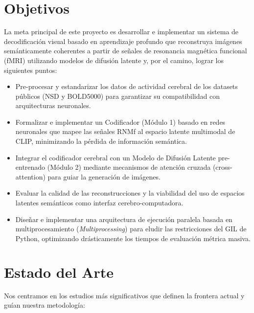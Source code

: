 \documentclass{article}
\begin{document}
\section{Objetivos}
La meta principal de este proyecto es desarrollar e implementar un sistema de decodificación visual basado en aprendizaje profundo que reconstruya imágenes semánticamente coherentes a partir de señales de resonancia magnética funcional (fMRI) utilizando modelos de difusión latente y, por el camino, lograr los siguientes puntos:
\begin{itemize}
    \item Pre-procesar y estandarizar los datos de actividad cerebral de los datasets públicos (NSD y BOLD5000) para garantizar su compatibilidad con arquitecturas neuronales.
    \item Formalizar e implementar un Codificador (Módulo 1) basado en redes neuronales que mapee las señales RNMf al espacio latente multimodal de CLIP, minimizando la pérdida de información semántica.
    \item Integrar el codificador cerebral con un Modelo de Difusión Latente pre-entrenado (Módulo 2) mediante mecanismos de atención cruzada (cross-attention) para guiar la generación de imágenes.
    \item Evaluar la calidad de las reconstrucciones y la viabilidad del uso de espacios latentes semánticos como interfaz cerebro-computadora.
    \item Diseñar e implementar una arquitectura de ejecución paralela basada en multiprocesamiento (\textit{Multiprocessing}) para eludir las restricciones del GIL de Python, optimizando drásticamente los tiempos de evaluación métrica masiva.
\end{itemize}


\section{Estado del Arte}
 Nos centramos en los estudios más significativos que definen la frontera actual y guían nuestra metodología:
\end{document}
